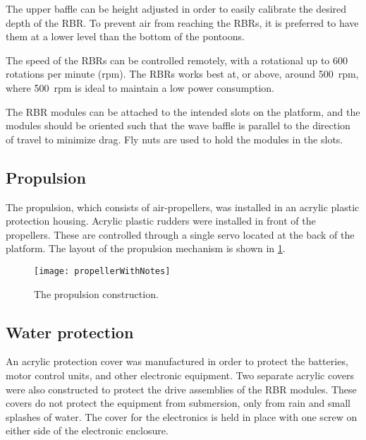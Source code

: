 The upper baffle can be height adjusted in order to easily calibrate the desired depth of the RBR. To prevent air from reaching the RBRs, it is preferred to have them at a lower level than the bottom of the pontoons.


The speed of the RBRs can be controlled remotely, with a rotational up to 600 rotations per minute (rpm). The RBRs works best at, or above, around 500~rpm, where 500~rpm is ideal to maintain a low power consumption.


The RBR modules can be attached to the intended slots on the platform, and the modules should be oriented such that the wave baffle is parallel to the direction of travel to minimize drag. Fly nuts are used to hold the modules in the slots.

\subsection{Propulsion}
The propulsion, which consists of air-propellers, was installed in an acrylic plastic protection housing. Acrylic plastic rudders were installed in front of the propellers. These are controlled through a single servo located at the back of the platform. The layout of the propulsion mechanism is shown in \cref{fig:propellerWithNotes}.

\begin{figure}[h]
   \centering
   \texttt{[image: propellerWithNotes]}
   \caption{The propulsion construction.}
   \label{fig:propellerWithNotes}
\end{figure}

\subsection{Water protection}

An acrylic protection cover was manufactured in order to protect the batteries, motor control units, and other electronic equipment. Two separate acrylic covers were also constructed to protect the drive assemblies of the RBR modules. These covers do not protect the equipment from submersion, only from rain and small splashes of water. %
The cover for the electronics is held in place with one screw on either side of the electronic enclosure.

